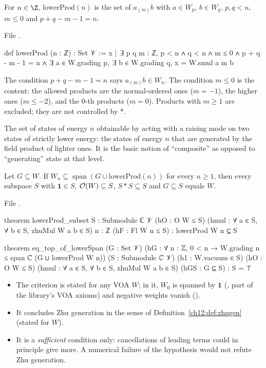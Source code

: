 \begin{definition}\label{ch12:def:lowerProd}
For $n\in\Z$, $\mathrm{lowerProd}(n)$ is the set of $a_{(m)}b$ with $a\in W_p$, $b\in W_q$,
$p,q<n$, $m\le0$ and $p+q-m-1=n$.
\end{definition}
File .
\begin{leancode}
def lowerProd (n : ℤ) : Set 𝒱 :=
  {x | ∃ p q m : ℤ, p < n ∧ q < n ∧ m ≤ 0 ∧ p + q - m - 1 = n ∧
    ∃ a ∈ W.grading p, ∃ b ∈ W.grading q, x = W.smul a m b}
\end{leancode}
\begin{dictionary}
The condition $p+q-m-1=n$ says $a_{(m)}b\in W_n$.  The condition $m\le0$ is the content: the allowed
products are the normal-ordered ones ($m=-1$), the higher ones ($m\le-2$), and the $0$-th products
($m=0$).  Products with $m\ge1$ are excluded; they are not controlled by $\ast$.
\end{dictionary}

\begin{physics}
The set of states of energy $n$ obtainable by acting with a raising mode on two states of strictly lower energy: the states of energy $n$ that are generated by the field product of lighter ones. It is the basic notion of ``composite'' as opposed to ``generating'' state at that level.
\end{physics}

\begin{theorem}\label{ch12:thm:eq_top_of_lowerSpan}
Let $G\subseteq W$.  If $W_n\subseteq\operatorname{span}(G\cup\mathrm{lowerProd}(n))$ for every
$n\ge1$, then every subspace $S$ with $\mathbf 1\in S$, $\mathcal{O}(W)\subseteq S$, $S\ast S\subseteq S$
and $G\subseteq S$ equals $W$.
\end{theorem}
File .
\begin{leancode}
theorem lowerProd_subset {S : Submodule ℂ 𝒱} (hO : O W ≤ S)
    (hmul : ∀ a ∈ S, ∀ b ∈ S, zhuMul W a b ∈ S) {n : ℤ} (hF : Fl W n ≤ S) :
    lowerProd W n ⊆ S

theorem eq_top_of_lowerSpan (G : Set 𝒱)
    (hG : ∀ n : ℤ, 0 < n → W.grading n ≤ span ℂ (G ∪ lowerProd W n))
    (S : Submodule ℂ 𝒱) (h1 : W.vacuum ∈ S) (hO : O W ≤ S)
    (hmul : ∀ a ∈ S, ∀ b ∈ S, zhuMul W a b ∈ S) (hGS : G ⊆ S) : S = ⊤
\end{leancode}
\begin{dictionary}
\begin{itemize}
\item The criterion is stated for any VOA $W$; in it, $W_0$ is spanned by $\mathbf 1$
  (, part of the library's VOA axioms) and negative weights vanish
  ().
\item It concludes Zhu generation in the sense of Definition~\ref{ch12:def:zhugen} (stated for $W$).
\item It is a \emph{sufficient} condition only: cancellations of leading terms could in principle give
  more.  A numerical failure of the hypothesis would not refute Zhu generation.
\end{itemize}
\end{dictionary}

